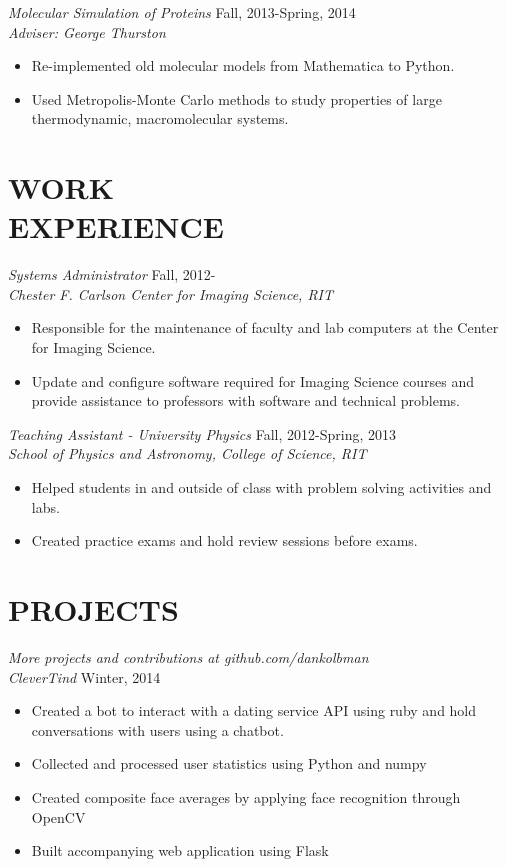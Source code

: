\documentclass[margin]{res}
\begin{document}
\begin{resume}
  {\sl Molecular Simulation of Proteins} \hfill   Fall, 2013-Spring, 2014 \\
  {\sl Adviser: George Thurston}\\                
  \begin{itemize}
    \item Re-implemented old molecular models from Mathematica to Python.
    \item Used Metropolis-Monte Carlo methods to study 
      properties of large thermodynamic, macromolecular systems.
  \end{itemize}
\section{WORK\\EXPERIENCE}

  {\sl Systems Administrator} \hfill            Fall, 2012- \\
  {\sl Chester F. Carlson Center for Imaging Science, RIT}\\
  \begin{itemize}
    \item Responsible for the maintenance of faculty and lab computers
      at the Center for Imaging Science.
    \item Update and configure software required for Imaging Science courses
      and provide assistance to professors with software and technical problems.
  \end{itemize}

  {\sl Teaching Assistant - University Physics} \hfill            Fall, 2012-Spring, 2013 \\
  {\sl School of Physics and Astronomy, College of Science, RIT}\\
  \begin{itemize}
    \item Helped students in and outside of class with problem solving activities and labs.
    \item Created practice exams and hold review sessions before exams.
  \end{itemize}
\section{PROJECTS}
  {\sl More projects and contributions at github.com/dankolbman}\\
  {\sl CleverTind} \hfill            Winter, 2014 \\
  \begin{itemize}
    \item Created a bot to interact with a dating service API using ruby and hold
      conversations with users using a chatbot.
    \item Collected and processed user statistics using Python and numpy
    \item Created composite face averages by applying face recognition through
      OpenCV
    \item Built accompanying web application using Flask
  \end{itemize}

\end{resume}
\end{document}

